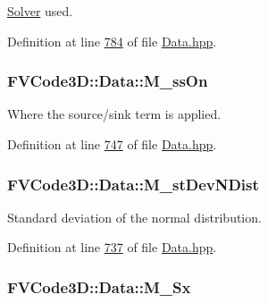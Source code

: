 \hyperlink{classFVCode3D_1_1Solver}{Solver} used. 



Definition at line \hyperlink{Data_8hpp_source_l00784}{784} of file \hyperlink{Data_8hpp_source}{Data.\+hpp}.

\subsubsection[{\texorpdfstring{M\+\_\+ss\+On}{M_ssOn}}]{ F\+V\+Code3\+D\+::\+Data\+::\+M\+\_\+ss\+On\hspace{0.3cm}{\ttfamily [protected]}}\hypertarget{classFVCode3D_1_1Data_af778c7ca663600660d71e09b2722ef57}{}\label{classFVCode3D_1_1Data_af778c7ca663600660d71e09b2722ef57}


Where the source/sink term is applied. 



Definition at line \hyperlink{Data_8hpp_source_l00747}{747} of file \hyperlink{Data_8hpp_source}{Data.\+hpp}.

\subsubsection[{\texorpdfstring{M\+\_\+st\+Dev\+N\+Dist}{M_stDevNDist}}]{ F\+V\+Code3\+D\+::\+Data\+::\+M\+\_\+st\+Dev\+N\+Dist\hspace{0.3cm}{\ttfamily [protected]}}\hypertarget{classFVCode3D_1_1Data_a03ec8d7e05410e0966e4380c84a4dc6a}{}\label{classFVCode3D_1_1Data_a03ec8d7e05410e0966e4380c84a4dc6a}


Standard deviation of the normal distribution. 



Definition at line \hyperlink{Data_8hpp_source_l00737}{737} of file \hyperlink{Data_8hpp_source}{Data.\+hpp}.

\subsubsection[{\texorpdfstring{M\+\_\+\+Sx}{M_Sx}}]{ F\+V\+Code3\+D\+::\+Data\+::\+M\+\_\+\+Sx\hspace{0.3cm}{\ttfamily [protected]}}\hypertarget{classFVCode3D_1_1Data_aabcbf0097b9af53baa21fe6c2e340aff}{}\label{classFVCode3D_1_1Data_aabcbf0097b9af53baa21fe6c2e340aff}


